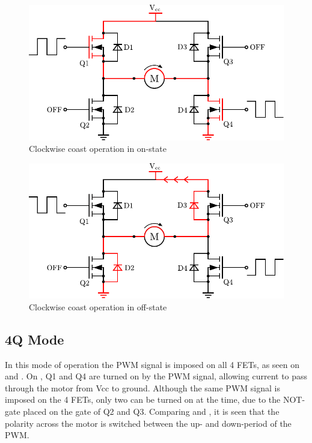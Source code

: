  \begin{minipage}{\linewidth}
  	\centering
  	\begin{minipage}{0.45\linewidth}
  		\begin{figure}[H]
  			\centering
  			\includegraphics[scale=.6]{figures/HbridgeClockwiseCoastON.pdf}
  			\caption{Clockwise coast operation in on-state}
  			\label{HbridgeClockwiseCoastON}
  		\end{figure}
  	\end{minipage}
  	\hspace{0.03\linewidth}
  	\begin{minipage}{0.45\linewidth}
  		\begin{figure}[H]
  			\centering
  			\includegraphics[scale=.6]{figures/HbridgeClockwiseCoastRegen.pdf}
  			\caption{Clockwise coast operation in off-state}
  			\label{HbridgeClokwiseCoastRegen}
  		\end{figure}
  	\end{minipage}
  \end{minipage}

\subsection{4Q Mode}
In this mode of operation the PWM signal is imposed on all 4 FETs, as seen on  and . On , Q1 and Q4 are turned on by the PWM signal, allowing current to pass through the motor from Vcc to ground. Although the same PWM signal is imposed on the 4 FETs, only two can be turned on at the time, due to the NOT-gate placed on the gate of Q2 and Q3. Comparing  and , it is seen that the polarity across the motor is switched between the up- and down-period of the PWM.

